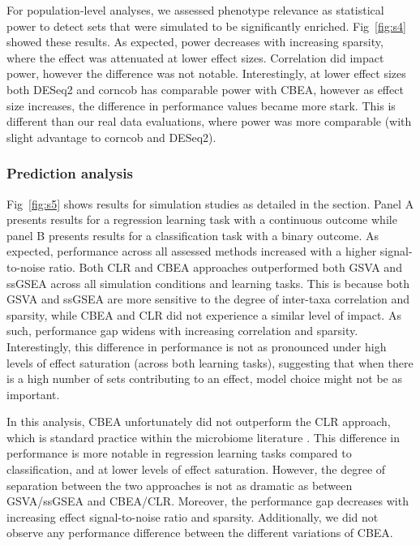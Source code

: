 \documentclass{article}
\begin{document}
For population-level analyses, we assessed phenotype relevance as statistical power to detect sets that were simulated to be significantly enriched. Fig~\ref{fig:s4} showed these results. As expected, power decreases with increasing sparsity, where the effect was attenuated at lower effect sizes. Correlation did impact power, however the difference was not notable. Interestingly, at lower effect sizes both DESeq2 and corncob has comparable power with CBEA, however as effect size increases, the difference in performance values became more stark. This is different than our real data evaluations, where power was more comparable (with slight advantage to corncob and DESeq2). 


\subsubsection{Prediction analysis}
Fig~\ref{fig:s5} shows results for simulation studies as detailed in the  section. Panel A presents results for a regression learning task with a continuous outcome while panel B presents results for a classification task with a binary outcome. As expected, performance across all assessed methods increased with a higher signal-to-noise ratio. Both CLR and CBEA approaches outperformed both GSVA and ssGSEA across all simulation conditions and learning tasks. This is because both GSVA and ssGSEA are more sensitive to the degree of inter-taxa correlation and sparsity, while CBEA and CLR did not experience a similar level of impact. As such, performance gap widens with increasing correlation and sparsity. Interestingly, this difference in performance is not as pronounced under high levels of effect saturation (across both learning tasks), suggesting that when there is a high number of sets contributing to an effect, model choice might not be as important.   

In this analysis, CBEA unfortunately did not outperform the CLR approach, which is standard practice within the microbiome literature \cite{gloor2017}. This difference in performance is more notable in regression learning tasks compared to classification, and at lower levels of effect saturation. However, the degree of separation between the two approaches is not as dramatic as between GSVA/ssGSEA and CBEA/CLR. Moreover, the performance gap decreases with increasing effect signal-to-noise ratio and sparsity. Additionally, we did not observe any performance difference between the different variations of CBEA. 
\end{document}
